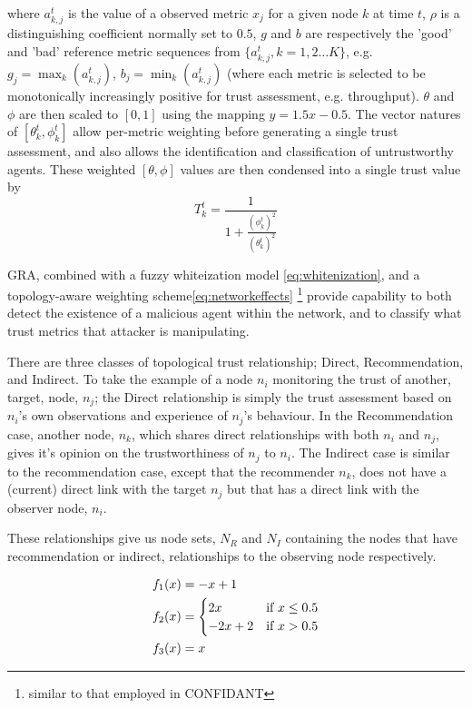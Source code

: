 \documentclass[runningheads,a4paper]{llncs}
\begin{document}
where $a_{k,j}^t$ is the value of a observed metric $x_j$ for a given node $k$ at time $t$, $\rho$ is a distinguishing coefficient normally set to $0.5$, $g$ and $b$ are respectively the 'good' and 'bad' reference metric sequences from $\{a_{k,j}^t, k=1,2\dots K\}$, e.g. $g_j=\max_k({a_{k,j}^t})$,  $b_j=\min_k({a_{k,j}^t})$ (where each metric is selected to be monotonically increasingly positive for trust assessment, e.g. throughput). $\theta$ and $\phi$ are then scaled to $[0,1]$ using the mapping $y = 1.5 x - 0.5$.
The vector natures of $[\theta_k^t,\phi_k^t]$ allow per-metric weighting before generating a single trust assessment, and also allows the identification and classification of untrustworthy agents.
These weighted $[\theta,\phi]$ values are then condensed into a single trust value by
\begin{equation}
  \label{eq:trustvalue}
  T_k^t = \frac{1}{1+\frac{(\phi_k^t)^2}{(\theta_k^t)^2}}
\end{equation}

GRA, combined with a fuzzy whiteization model \eqref{eq:whitenization}, and a topology-aware weighting scheme\eqref{eq:networkeffects} \footnote{similar to that employed in CONFIDANT} provide capability to both detect the existence of a malicious agent within the network, and to classify what trust metrics that attacker is manipulating.

There are three classes of topological trust relationship; Direct, Recommendation, and Indirect.
To take the example of a node $n_i$ monitoring the trust of another, target, node, $n_j$; the Direct relationship is simply the trust assessment based on $n_i$'s own observations and experience of $n_j$'s behaviour.
In the Recommendation case, another node, $n_k$, which shares direct relationships with both $n_i$ and $n_j$, gives it's opinion on the trustworthiness of $n_j$ to $n_i$.
The Indirect case is similar to the recommendation case, except that the recommender $n_k$, does not have a (current) direct link with the target $n_j$ but that has a direct link with the observer node, $n_i$.

These relationships give us node sets, $N_R$ and $N_I$ containing the nodes that have recommendation or indirect, relationships to the observing node respectively.

\begin{align}
  \label{eq:whitenization}
  f_1(x) &= -x+1\notag\\
  f_2(x) &= 
  \begin{cases}
    2x & \text{if }x\leq 0.5\\
    -2x+2 & \text{if }x>0.5
  \end{cases}\\
  f_3(x) &= x\notag
\end{align}
\end{document}
